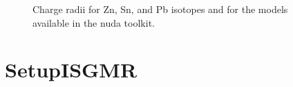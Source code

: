 \documentclass[letterpaper,10pt,english]{sphinxmanual}
\begin{document}
\begin{figure}[htbp]
\centering
\capstart

\noindent{}
\caption{Charge radii for Zn, Sn, and Pb isotopes and for the models available in the nuda toolkit.}\label{\detokenize{source/api/setup_rad_ch:id1}}\end{figure}

\sphinxstepscope


\section{SetupISGMR}
\label{\detokenize{source/api/setup_ISGMR:setupisgmr}}\label{\detokenize{source/api/setup_ISGMR::doc}}\label{\detokenize{source/api/setup_ISGMR:module-nucleardatapy.setup_ISGMR}}
\end{document}
